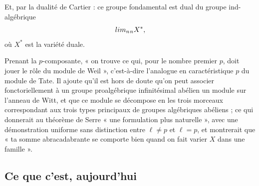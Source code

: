 \documentclass[11pt,a4paper]{article}
\begin{document}
Et, par la dualité de Cartier : ce groupe fondamental est dual du groupe
ind-algébrique
\[
  \varinjlim_{n} {}_{n}X^{*} ,
\]
où $X^{*}$ est la variété duale.

Prenant la $p$-composante, « on trouve ce qui, pour le nombre premier $p$, doit
jouer le rôle du module de Weil », c'est-à-dire l'analogue en
caractéristique $p$ du module de Tate. Il ajoute qu'il est hors de doute qu'on
peut associer fonctoriellement à un groupe proalgébrique infinitésimal abélien
un module sur l'anneau de Witt, et que ce module se décompose en les trois
morceaux correspondant aux trois types principaux de groupes algébriques
abéliens ; ce qui donnerait au théorème de Serre « une formulation plus
naturelle », avec une démonstration uniforme sans distinction entre
$\ell \neq p$ et $\ell = p$, et montrerait que « ta somme abracadabrante se
comporte bien quand on fait varier $X$ dans une famille ».

\subsection*{Ce que c'est, aujourd'hui}
\end{document}
